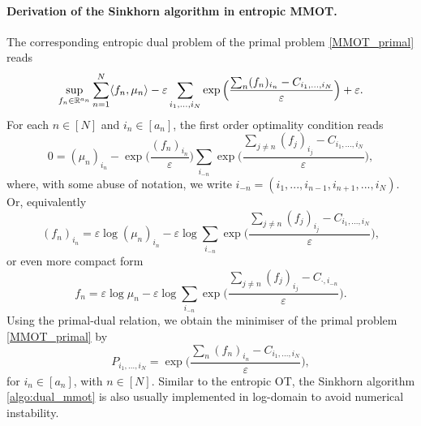 \paragraph{Derivation of the Sinkhorn algorithm in entropic MMOT.} The corresponding entropic dual problem of the primal problem
\ref{MMOT_primal} reads
\begin{equation*}
  \sup_{f_n \in \mathbb R^{a_n}} \sum_{n=1}^N \langle f_n, \mu_n \rangle -
  \varepsilon \sum_{i_1,...,i_N} \exp\Big( \frac{\sum_n (f_n)_{i_n} - C_{i_1,...,i_N}}{\varepsilon} \Big) + \varepsilon.
\end{equation*}
For each $n \in [N]$ and $i_n \in [a_n]$, the first order optimality condition reads
\begin{equation*}
  0 = (\mu_n)_{i_n} - \exp\big( \frac{(f_n)_{i_n}}{\varepsilon} \big)
  \sum_{i_{-n}} \exp\Big( \frac{\sum_{j \neq n} (f_j)_{i_j} - C_{i_1,...,i_N}}{\varepsilon} \Big),
\end{equation*}
where, with some abuse of notation, we write $i_{-n} = (i_1, ..., i_{n-1}, i_{n+1}, ..., i_N)$. Or, equivalently
\begin{equation*}
  (f_n)_{i_n} = \varepsilon \log (\mu_n)_{i_n} - \varepsilon \log \sum_{i_{-n}}
  \exp\Big( \frac{\sum_{j \neq n} (f_j)_{i_j} - C_{i_1,...,i_N}}{\varepsilon} \Big),
\end{equation*}
or even more compact form
\begin{equation*}
  f_n = \varepsilon \log \mu_n - \varepsilon \log \sum_{i_{-n}}
  \exp\Big( \frac{\sum_{j \neq n} (f_j)_{i_j} - C_{\cdot, i_{-n}}}{\varepsilon} \Big).
\end{equation*}
Using the primal-dual relation, we obtain the minimiser of the primal problem \ref{MMOT_primal} by
\begin{equation*}
  P_{i_1,...,i_N} = \exp\Big( \frac{\sum_n (f_n)_{i_n} - C_{i_1,...,i_N}}{\varepsilon} \Big),
\end{equation*}
for $i_n \in [a_n]$, with $n \in [N]$.
Similar to the entropic OT, the Sinkhorn algorithm \ref{algo:dual_mmot} is also usually implemented in log-domain to avoid numerical instability.
